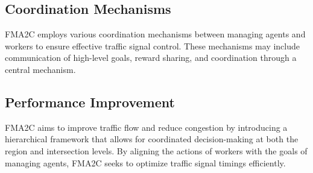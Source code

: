 \subsection{Coordination Mechanisms}

FMA2C employs various coordination mechanisms between managing agents and workers to ensure effective traffic signal control. These mechanisms may include communication of high-level goals, reward sharing, and coordination through a central mechanism.

\subsection{Performance Improvement}

FMA2C aims to improve traffic flow and reduce congestion by introducing a hierarchical framework that allows for coordinated decision-making at both the region and intersection levels. By aligning the actions of workers with the goals of managing agents, FMA2C seeks to optimize traffic signal timings efficiently.

